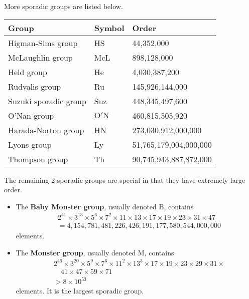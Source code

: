 More sporadic groups are listed below.
\begin{table}[h]
    \centering
    \begin{tabular}{|l|l|l|}
        \hline
        \textbf{Group}        & \textbf{Symbol} & \textbf{Order}  \\ \hline
        Higman-Sims group\index{Higman-Sims group}     & HS              & 44,352,000      \\ \hline
        McLaughlin group\index{McLaughlin group}      & McL             & 898,128,000     \\ \hline
        Held group\index{Held group}            & He              & 4,030,387,200   \\ \hline
        Rudvalis group\index{Rudvalis group}        & Ru              & 145,926,144,000 \\ \hline
        Suzuki sporadic group\index{Suzuki sporadic group} & Suz             & 448,345,497,600 \\ \hline
        O'Nan group\index{O'Nan group}           & $\mathrm{O'N}$  & 460,815,505,920 \\ \hline
        Harada-Norton group\index{Harada-Norton group}   & HN              & 273,030,912,000,000    \\ \hline
        Lyons group\index{Lyons group}           & Ly              & 51,765,179,004,000,000 \\ \hline
        Thompson group\index{Thompson group}        & Th              & 90,745,943,887,872,000 \\ \hline
    \end{tabular}
\end{table}

The remaining 2 sporadic groups are special in that they have extremely large order.
\begin{itemize}
    \item The \textbf{Baby Monster group}, usually denoted $\mathrm{B}$, contains
    \begin{align*}
        &2^{41} \times 3^{13} \times 5^6 \times 7^2 \times 11 \times 13 \times 17 \times 19 \times 23 \times 31 \times 47\\
        &= 4,154,781,481,226,426,191,177,580,544,000,000
    \end{align*}
    elements.
    \item The \textbf{Monster group}, usually denoted $\mathrm{M}$, contains
    \begin{align*}
        &2^{46} \times 3^{20} \times 5^9 \times 7^6 \times 11^{2} \times 13^3 \times 17 \times 19 \times 23 \times 29 \times 31 \times \\
        &\quad 41 \times 47 \times 59 \times 71\\
        &> 8 \times 10^{53}
    \end{align*}
    elements. It is the largest sporadic group.
\end{itemize}
